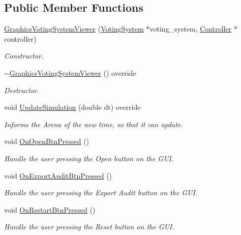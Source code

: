 \subsection*{Public Member Functions}
\begin{DoxyCompactItemize}
\item 
\hyperlink{classGraphicsVotingSystemViewer_a1664de5d9143fe92cdd4eaa483ca7a6d}{Graphics\+Voting\+System\+Viewer} (\hyperlink{classVotingSystem}{Voting\+System} $\ast$voting\+\_\+system, \hyperlink{classController}{Controller} $\ast$controller)
\begin{DoxyCompactList}\small\item\em Constructor. \end{DoxyCompactList}\item 
\hyperlink{classGraphicsVotingSystemViewer_a6a47acef4e0c072857b8487146766a11}{$\sim$\+Graphics\+Voting\+System\+Viewer} () override
\begin{DoxyCompactList}\small\item\em Destructor. \end{DoxyCompactList}\item 
void \hyperlink{classGraphicsVotingSystemViewer_a13ebb27a0162188b69b1bd01d29e45d5}{Update\+Simulation} (double dt) override
\begin{DoxyCompactList}\small\item\em Informs the Arena of the new time, so that it can update. \end{DoxyCompactList}\item 
void \hyperlink{classGraphicsVotingSystemViewer_a457e7a3289e9dc9398d6b2e70e3ab009}{On\+Open\+Btn\+Pressed} ()
\begin{DoxyCompactList}\small\item\em Handle the user pressing the Open button on the G\+UI. \end{DoxyCompactList}\item 
void \hyperlink{classGraphicsVotingSystemViewer_abfe9cdae267e421f59b05e2e1c076778}{On\+Export\+Audit\+Btn\+Pressed} ()
\begin{DoxyCompactList}\small\item\em Handle the user pressing the Export Audit button on the G\+UI. \end{DoxyCompactList}\item 
void \hyperlink{classGraphicsVotingSystemViewer_aeeb0a10bc206355565d3e26fbbf16b20}{On\+Restart\+Btn\+Pressed} ()
\begin{DoxyCompactList}\small\item\em Handle the user pressing the Reset button on the G\+UI. \end{DoxyCompactList}\item 

\end{DoxyCompactItemize}
